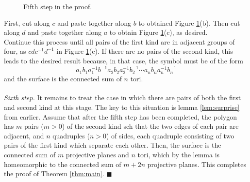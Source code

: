 \documentclass{article}
\theoremstyle{definition}
\begin{document}
\begin{figure}[!htb]
  \centering
  
  \caption{Fifth step in the proof.}
  \label{fig:step five}
\end{figure}
First, cut along $c$ and paste together along $b$ to obtained Figure \ref{fig:step five}(b). Then cut along $d$ and paste together along $a$ to obtain Figure \ref{fig:step five}(c), as desired.\\
Continue this process until all pairs of the first kind are in adjacent groups of four, as $cdc^{-1}d^{-1}$ in Figure \ref{fig:step five}(c). If there are no pairs of the second kind, this leads to the desired result because, in that case, the symbol must be of the form
\[a_1b_1a_1^{-1}b^{-1}a_2b_2a_2^{-1}b_2^{-1}\cdots a_nb_na_n^{-1}b_n^{-1}\]
and the surface is the connected sum of $n$ tori.\\~\\
%
\emph{Sixth step.} It remains to treat the case in which there are pairs of both the first and second kind at this stage. The key to this situation is lemma \ref{lem:surprise} from earlier. Assume that after the fifth step has been completed, the polygon has $m$ pairs ($m > 0$) of the second kind sch that the two edges of each pair are adjacent, and $n$ quadruples ($n > 0$) of sides, each quadruple consisting of two pairs of the first kind which separate each other. Then, the surface is the connected sum of $m$ projective planes and $n$ tori, which by the lemma is homeomorphic to the connected sum of $m + 2n$ projective planes. This completes the proof of Theorem \ref{thm:main}. \hfill $\blacksquare$
%
\end{document}
